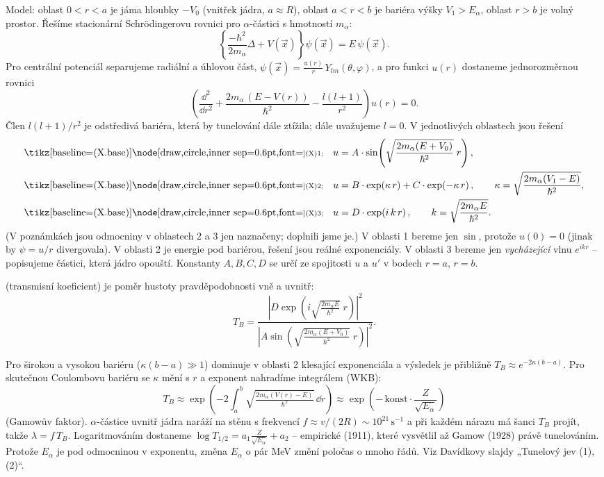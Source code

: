 Model: oblast  \(0<r<a\) je jáma hloubky \(-V_0\) (vnitřek jádra, \(a\approx R\)), oblast  \(a<r<b\) je bariéra
výšky \(V_1 > E_\alpha\), oblast  \(r>b\) je volný prostor. Řešíme stacionární Schrödingerovu rovnici pro \(\alpha\)-částici
s hmotností \(m_\alpha\):
\[
  \left\{\frac{-\hbar^2}{2m_\alpha}\Delta + V(\vec{x})\right\}\psi(\vec{x}) = E\,\psi(\vec{x}) .
\]
Pro centrální potenciál separujeme radiální a úhlovou část,
\(\psi(\vec{x}) = \frac{u(r)}{r}\,Y_{lm}(\theta,\varphi)\), a pro funkci \(u(r)\) dostaneme jednorozměrnou rovnici
\[
  \left(\frac{\dd^2}{\dd r^2} + \frac{2m_\alpha\,(E-V(r))}{\hbar^2} - \frac{l(l+1)}{r^2}\right)u(r) = 0 .
\]
Člen \(l(l+1)/r^2\) je odstředivá bariéra, která by tunelování dále ztížila; dále uvažujeme \(l=0\). V jednotlivých oblastech
jsou řešení
\begin{align*}
  \jcCtyrKruh1\quad & u = A\cdot\sin\!\left(\sqrt{\frac{2m_\alpha(E+V_0)}{\hbar^2}}\;r\right), \\
  \jcCtyrKruh2\quad & u = B\cdot\exp\!\left(\kappa\, r\right) + C\cdot\exp\!\left(-\kappa\, r\right),
     \qquad \kappa = \sqrt{\frac{2m_\alpha(V_1-E)}{\hbar^2}}, \\
  \jcCtyrKruh3\quad & u = D\cdot\exp\!\left(i\, k\, r\right), \qquad k = \sqrt{\frac{2m_\alpha E}{\hbar^2}} .
\end{align*}
(V poznámkách jsou odmocniny v oblastech 2 a 3 jen naznačeny; doplnili jsme je.) V oblasti 1 bereme jen \(\sin\),
protože \(u(0)=0\) (jinak by \(\psi = u/r\) divergovala). V oblasti 2 je energie pod bariérou, řešení jsou reálné
exponenciály. V oblasti 3 bereme jen \emph{vycházející} vlnu \(e^{ikr}\) -- popisujeme částici, která jádro opouští.
Konstanty \(A,B,C,D\) se určí ze spojitosti \(u\) a \(u'\) v bodech \(r=a\), \(r=b\).

 (transmisní koeficient) je poměr hustoty pravděpodobnosti vně a uvnitř:
\[
  T_B = \frac{\left|D\exp\!\left(i\sqrt{\tfrac{2m_\alpha E}{\hbar^2}}\;r\right)\right|^2}{\left|A\sin\!\left(\sqrt{\tfrac{2m_\alpha(E+V_0)}{\hbar^2}}\;r\right)\right|^2} .
\]

\begin{vysvetleni}
Pro širokou a vysokou bariéru (\(\kappa(b-a)\gg1\)) dominuje v oblasti 2 klesající exponenciála a výsledek je přibližně
\(T_B \approx e^{-2\kappa(b-a)}\). Pro skutečnou Coulombovu bariéru se \(\kappa\) mění s \(r\) a exponent nahradíme integrálem
(WKB):
\[
  T_B \approx \exp\!\left(-2\int_a^b \sqrt{\tfrac{2m_\alpha (V(r)-E)}{\hbar^2}}\,\dd r\right)
  \approx \exp\!\left(-\,\text{konst}\cdot\frac{Z}{\sqrt{E_\alpha}}\right)
\]
(Gamowův faktor). \(\alpha\)-částice uvnitř jádra naráží na stěnu s frekvencí \(f \approx v/(2R) \sim 10^{21}\,\mathrm{s}^{-1}\)
a při každém nárazu má šanci \(T_B\) projít, takže \(\lambda = f\,T_B\). Logaritmováním dostaneme
\(\log T_{1/2} = a_1\frac{Z}{\sqrt{E_\alpha}} + a_2\) -- empirické  (1911), které vysvětlil
až Gamow (1928) právě tunelováním. Protože \(E_\alpha\) je pod odmocninou v exponentu, změna \(E_\alpha\) o pár MeV změní
poločas o mnoho řádů. Viz Davídkovy slajdy „Tunelový jev (1), (2)“.
\end{vysvetleni}

